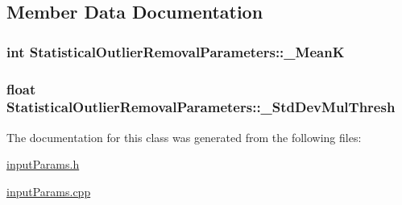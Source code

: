 \subsection{Member Data Documentation}
\hypertarget{classStatisticalOutlierRemovalParameters_a55ceb4510332a315c31eeaf852e1d142}{
\subsubsection[{\-\_\-\-Mean\-K}]{\setlength{\rightskip}{0pt plus 5cm}int Statistical\-Outlier\-Removal\-Parameters\-::\-\_\-\-Mean\-K\hspace{0.3cm}{\ttfamily [private]}}}\label{classStatisticalOutlierRemovalParameters_a55ceb4510332a315c31eeaf852e1d142}
\hypertarget{classStatisticalOutlierRemovalParameters_ab299f0e6f831b50b4ecf59be328f7624}{
\subsubsection[{\-\_\-\-Std\-Dev\-Mul\-Thresh}]{\setlength{\rightskip}{0pt plus 5cm}float Statistical\-Outlier\-Removal\-Parameters\-::\-\_\-\-Std\-Dev\-Mul\-Thresh\hspace{0.3cm}{\ttfamily [private]}}}\label{classStatisticalOutlierRemovalParameters_ab299f0e6f831b50b4ecf59be328f7624}


The documentation for this class was generated from the following files\-:\begin{DoxyCompactItemize}
\item 
\hyperlink{inputParams_8h}{input\-Params.\-h}\item 
\hyperlink{inputParams_8cpp}{input\-Params.\-cpp}\end{DoxyCompactItemize}
